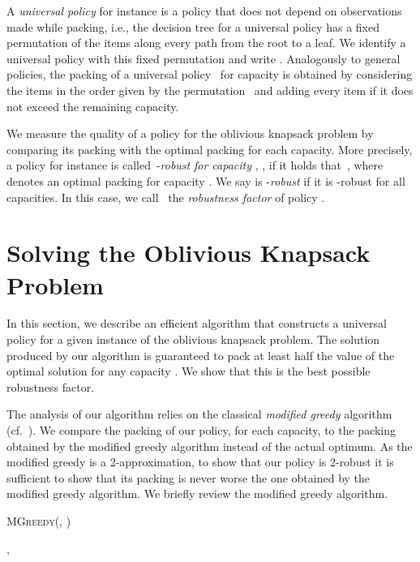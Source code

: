 \documentclass[11pt]{article}
\begin{document}
A \emph{universal policy } for instance  is a
policy that does not depend on observations made while packing, i.e.,
the decision tree for a universal policy has a fixed permutation of
the items along every path from the root to a leaf. We identify a
universal policy with this fixed permutation and write .
Analogously to general policies, the packing 
of a universal policy~ for capacity 
is obtained by considering the items in the order given by the permutation~
and adding every item if it does not exceed the remaining capacity. 

We measure the quality of a policy for the oblivious knapsack problem
by comparing its packing with the optimal packing for each capacity.
More precisely, a policy  for instance 
is called~-\emph{robust} \emph{for capacity} , ,
if it holds that~,
where  denotes an optimal packing for
capacity . We say  is -\emph{robust} if
it is -robust for all capacities. In this case, we call~
the \emph{robustness factor} of policy .


\section{Solving the Oblivious Knapsack Problem\label{sec:Algorithm}}

In this section, we describe an efficient algorithm that constructs
a universal policy for a given instance of the oblivious knapsack
problem. The solution produced by our algorithm is guaranteed to pack
at least half the value of the optimal solution for any capacity .
We show that this is the best possible robustness factor. 

The analysis of our algorithm relies on the classical \emph{modified
greedy} algorithm (cf.~\cite{korteV02}). We compare the packing
of our policy, for each capacity, to the packing obtained by the modified
greedy algorithm instead of the actual optimum. As the modified greedy
is a 2-approximation, to show that our policy is 2-robust it is sufficient
to show that its packing is never worse the one obtained by the modified
greedy algorithm. We briefly review the modified greedy algorithm.

\begin{algorithm}[b]   
  \DontPrintSemicolon 
  \caption{\textsc{MGreedy}(, )}\label{alg:mgreedy}     

  \;
  \;   
  , \;   
  \uIf{}   
  {\Return \; }   
  \Else   {\Return \; } 
\end{algorithm}
\end{document}
